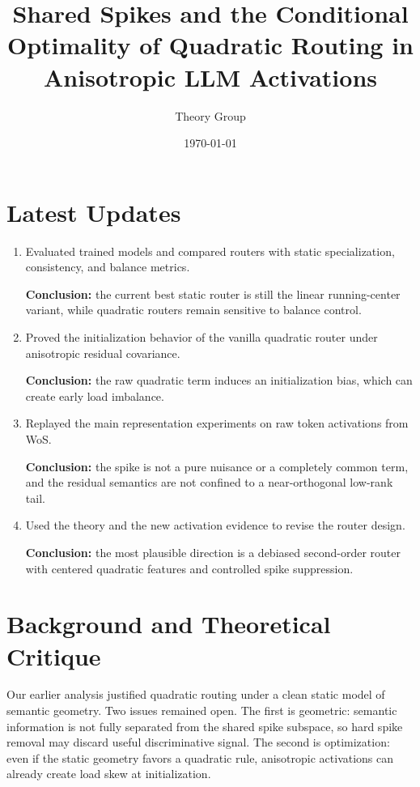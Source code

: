 \documentclass[11pt]{article}
\title{Shared Spikes and the Conditional Optimality of Quadratic Routing in Anisotropic LLM Activations}
\author{Theory Group}
\date{\today}
\begin{document}
\maketitle

% 

\section{Latest Updates}

\begin{enumerate}
  \item Evaluated trained models and compared routers with static specialization, consistency, and balance metrics.

  \textbf{Conclusion:} the current best static router is still the linear running-center variant, while quadratic routers remain sensitive to balance control.

  \item  Proved the initialization behavior of the vanilla quadratic router under anisotropic residual covariance.

  \textbf{Conclusion:} the raw quadratic term induces an initialization bias, which can create early load imbalance. 

  \item  Replayed the main representation experiments on raw token activations from WoS.

  \textbf{Conclusion:} the spike is not a pure nuisance or a completely common term, and the residual semantics are not confined to a near-orthogonal low-rank tail.

  \item  Used the theory and the new activation evidence to revise the router design.

  \textbf{Conclusion:} the most plausible direction is a debiased second-order router with centered quadratic features and controlled spike suppression.
\end{enumerate}

\section{Background and Theoretical Critique}

Our earlier analysis justified quadratic routing under a clean static model of semantic geometry. Two issues remained open. The first is geometric: semantic information is not fully separated from the shared spike subspace, so hard spike removal may discard useful discriminative signal. The second is optimization: even if the static geometry favors a quadratic rule, anisotropic activations can already create load skew at initialization. 
\end{document}
